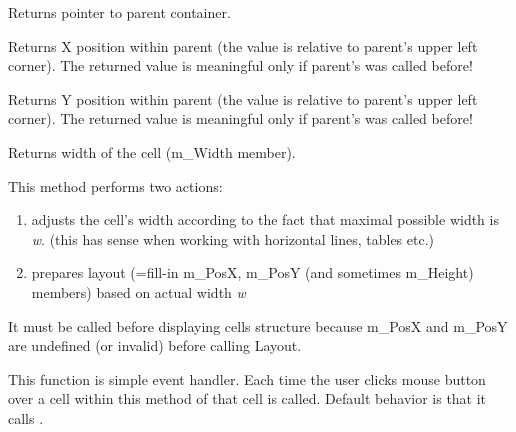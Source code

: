 \label{wxhtmlcellgetparent}


Returns pointer to parent container.

\label{wxhtmlcellgetposx}


Returns X position within parent (the value is relative to parent's
upper left corner). The returned value is meaningful only if
parent's  was called before!

\label{wxhtmlcellgetposy}


Returns Y position within parent (the value is relative to parent's
upper left corner). The returned value is meaningful only if
parent's  was called before!

\label{wxhtmlcellgetwidth}


Returns width of the cell (m\_Width member).

\label{wxhtmlcelllayout}


This method performs two actions:

\begin{enumerate}\itemsep=0pt
\item adjusts the cell's width according to the fact that maximal possible width is {\it w}.
(this has sense when working with horizontal lines, tables etc.)
\item prepares layout (=fill-in m\_PosX, m\_PosY (and sometimes m\_Height) members)
based on actual width {\it w}
\end{enumerate}

It must be called before displaying cells structure because
m\_PosX and m\_PosY are undefined (or invalid)
before calling Layout.

\label{wxhtmlcellonmouseclick}


This function is simple event handler. Each time the user clicks mouse button over a cell
within  this method of that cell is called. Default behavior is
that it calls .

